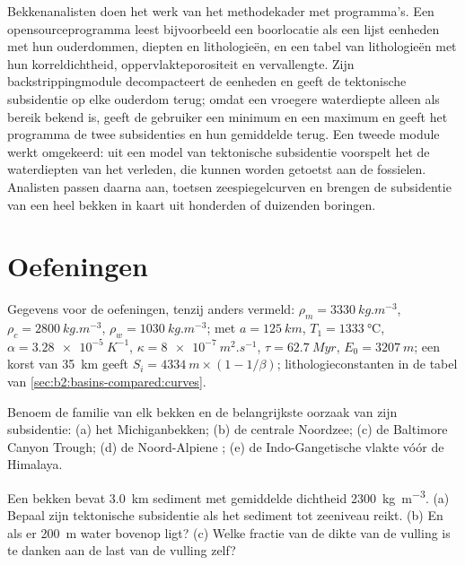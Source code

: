 \begin{inthelab}[Subsidentieanalyse]
Bekkenanalisten doen het werk van het methodekader met programma's. Een opensourceprogramma
leest bijvoorbeeld een boorlocatie als een lijst eenheden met hun ouderdommen, diepten en lithologieën, en een
tabel van lithologieën met hun korreldichtheid, oppervlakteporositeit en vervallengte. Zijn
backstrippingmodule decompacteert de eenheden en geeft de tektonische subsidentie op elke ouderdom terug;
omdat een vroegere waterdiepte alleen als bereik bekend is, geeft de gebruiker een minimum en een maximum en
geeft het programma de twee subsidenties en hun gemiddelde terug. Een tweede module werkt omgekeerd:
uit een model van tektonische subsidentie voorspelt het de waterdiepten van het verleden, die kunnen worden
getoetst aan de fossielen. Analisten passen daarna  aan, toetsen zeespiegelcurven en
brengen de subsidentie van een heel bekken in kaart uit honderden of duizenden boringen.
\end{inthelab}

\section*{Oefeningen}\label{sec:b2:basins-compared:exercises}

Gegevens voor de oefeningen, tenzij anders vermeld: $\rho_m = \qty{3330}{kg.m^{-3}}$, $\rho_c =
\qty{2800}{kg.m^{-3}}$, $\rho_w = \qty{1030}{kg.m^{-3}}$;  met $a =
\qty{125}{km}$, $T_1 = \qty{1333}{\celsius}$, $\alpha = \qty{3.28e-5}{K^{-1}}$, $\kappa =
\qty{8e-7}{m^2.s^{-1}}$, $\tau = \qty{62.7}{Myr}$, $E_0 = \qty{3207}{m}$; een korst van \qty{35}{km}
geeft $S_i = \qty{4334}{m}\times(1 - 1/\beta)$; lithologieconstanten in de tabel van
\cref{sec:b2:basins-compared:curves}.

\begin{exercise}[$\star$]\label{exo:b2:basins-compared:1}
Benoem de familie van elk bekken en de belangrijkste oorzaak van zijn subsidentie: (a) het Michiganbekken;
(b) de centrale Noordzee; (c) de Baltimore Canyon Trough; (d) de Noord-Alpiene ;
(e) de Indo-Gangetische vlakte vóór de Himalaya.
\end{exercise}

\begin{exercise}[$\star$]\label{exo:b2:basins-compared:2}
Een bekken bevat \qty{3.0}{km} sediment met gemiddelde dichtheid \qty{2300}{kg.m^{-3}}. (a) Bepaal zijn
tektonische subsidentie als het sediment tot zeeniveau reikt. (b) En als er \qty{200}{m} water
bovenop ligt? (c) Welke fractie van de dikte van de vulling is te danken aan de last van de vulling zelf?
\end{exercise}

